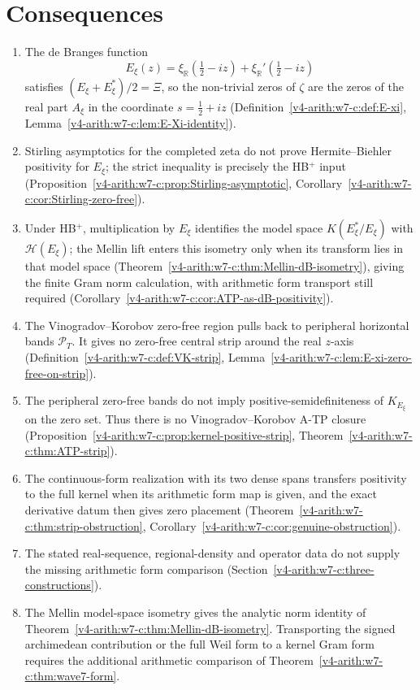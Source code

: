 \section{Consequences}
\label{v4-arith:w7-c:summary}

\begin{enumerate}
\item The de Branges function
\[
E_{\xi}(z)=\xi_{\mathbb R}(\tfrac12-iz)+
\xi_{\mathbb R}'(\tfrac12-iz)
\]
satisfies \((E_{\xi}+E_{\xi}^{*})/2=\Xi\), so the non-trivial zeros
of \(\zeta\) are the zeros of the real part \(A_{\xi}\) in the
coordinate \(s=\tfrac12+iz\)
(Definition~\ref{v4-arith:w7-c:def:E-xi},
Lemma~\ref{v4-arith:w7-c:lem:E-Xi-identity}).
\item Stirling asymptotics for the completed zeta do not prove
Hermite--Biehler positivity for \(E_{\xi}\); the strict inequality
is precisely the HB\(^{+}\) input
(Proposition~\ref{v4-arith:w7-c:prop:Stirling-asymptotic},
Corollary~\ref{v4-arith:w7-c:cor:Stirling-zero-free}).
\item Under HB\(^{+}\), multiplication by \(E_{\xi}\) identifies the
model space \(K(E_{\xi}^{*}/E_{\xi})\) with \(\mathcal H(E_{\xi})\);
the Mellin lift enters this isometry only when its transform lies in
that model space
(Theorem~\ref{v4-arith:w7-c:thm:Mellin-dB-isometry}), giving the finite Gram norm calculation, with arithmetic form
transport still required
(Corollary~\ref{v4-arith:w7-c:cor:ATP-as-dB-positivity}).
\item The Vinogradov--Korobov zero-free region pulls back to
peripheral horizontal bands \(\mathcal P_T\). It gives no
zero-free central strip around the real \(z\)-axis
(Definition~\ref{v4-arith:w7-c:def:VK-strip},
Lemma~\ref{v4-arith:w7-c:lem:E-xi-zero-free-on-strip}).
\item The peripheral zero-free bands do not imply
positive-semidefiniteness of \(K_{E_{\xi}}\) on the zero set. Thus
there is no Vinogradov--Korobov A-TP closure
(Proposition~\ref{v4-arith:w7-c:prop:kernel-positive-strip},
Theorem~\ref{v4-arith:w7-c:thm:ATP-strip}).
\item The continuous-form realization with its two dense spans transfers
positivity to the full kernel when its arithmetic form map is given,
and the exact derivative datum then gives zero placement
(Theorem~\ref{v4-arith:w7-c:thm:strip-obstruction},
Corollary~\ref{v4-arith:w7-c:cor:genuine-obstruction}).
\item The stated real-sequence, regional-density and operator data do not
supply the missing arithmetic form comparison (Section~\ref{v4-arith:w7-c:three-constructions}).
\item The Mellin model-space isometry gives the analytic norm
identity of Theorem~\ref{v4-arith:w7-c:thm:Mellin-dB-isometry}.
Transporting the signed archimedean contribution or the full Weil
form to a kernel Gram form requires the additional arithmetic
comparison of Theorem~\ref{v4-arith:w7-c:thm:wave7-form}.
\end{enumerate}

